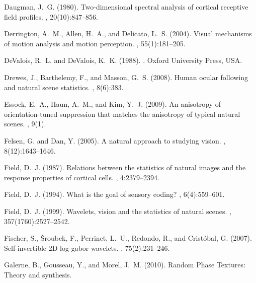 \documentclass[a4paper,11pt]{article}%
\begin{document}
\begin{thebibliography}{}
Daugman, J.~G. (1980).
\newblock Two-dimensional spectral analysis of cortical receptive field
  profiles.
, 20(10):847--856.

Derrington, A.~M., Allen, H.~A., and Delicato, L.~S. (2004).
\newblock Visual mechanisms of motion analysis and motion perception.
, 55(1):181--205.

DeValois, R.~L. and DeValois, K.~K. (1988).
.
\newblock Oxford University Press, USA.

Drewes, J., Barthelemy, F., and Masson, G.~S. (2008).
\newblock Human ocular following and natural scene statistics.
, 8(6):383.

Essock, E.~A., Haun, A.~M., and Kim, Y.~J. (2009).
\newblock An anisotropy of orientation-tuned suppression that matches the
  anisotropy of typical natural scenes.
, 9(1).

Felsen, G. and Dan, Y. (2005).
\newblock A natural approach to studying vision.
, 8(12):1643--1646.

Field, D.~J. (1987).
\newblock Relations between the statistics of natural images and the response
  properties of cortical cells.
, 4:2379--2394.

Field, D.~J. (1994).
\newblock What is the goal of sensory coding?
, 6(4):559--601.

Field, D.~J. (1999).
\newblock Wavelets, vision and the statistics of natural scenes.
, 357(1760):2527--2542.

Fischer, S., \v{S}roubek, F., Perrinet, L.~U., Redondo, R., and Crist{\'o}bal,
  G. (2007).
\newblock Self-invertible {2D} log-gabor wavelets.
, 75(2):231--246.

Galerne, B., Gousseau, Y., and Morel, J.~M. (2010).
\newblock Random {P}hase {T}extures: Theory and synthesis.


\end{thebibliography}
\end{document}
